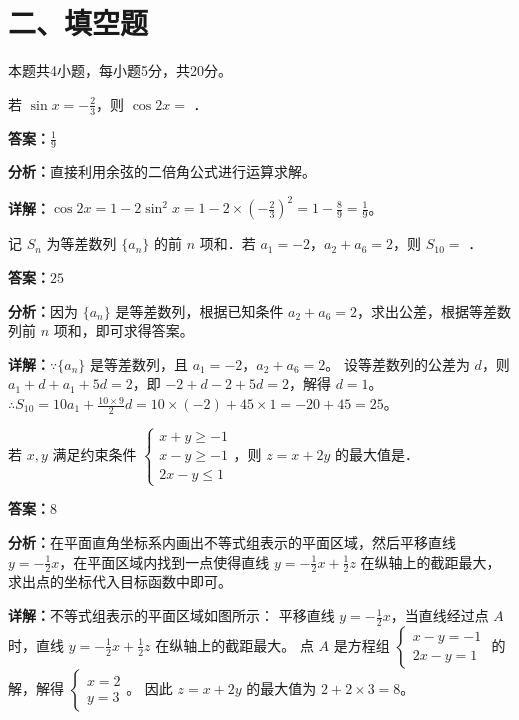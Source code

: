 \section*{二、填空题}
本题共4小题，每小题5分，共20分。

\begin{question}[points=5]
若 $\sin x = -\frac{2}{3}$，则 $\cos 2x = $ ．
\fillin[{$\frac{1}{9}$}]
\begin{solution}
\textbf{答案：}$\frac{1}{9}$

\textbf{分析：}直接利用余弦的二倍角公式进行运算求解。

\textbf{详解：}$\cos 2x = 1-2\sin^2 x = 1-2\times\left(-\frac{2}{3}\right)^2 = 1-\frac{8}{9} = \frac{1}{9}$。
\end{solution}
\end{question}

\begin{question}[points=5]
记 $S_n$ 为等差数列 $\{a_n\}$ 的前 $n$ 项和．若 $a_1=-2$，$a_2+a_6=2$，则 $S_{10}=$ ．
\fillin[{$25$}]
\begin{solution}
\textbf{答案：}$25$

\textbf{分析：}因为 $\{a_n\}$ 是等差数列，根据已知条件 $a_2+a_6=2$，求出公差，根据等差数列前 $n$ 项和，即可求得答案。

\textbf{详解：}$\because \{a_n\}$ 是等差数列，且 $a_1=-2$，$a_2+a_6=2$。
设等差数列的公差为 $d$，则 $a_1+d+a_1+5d=2$，即 $-2+d-2+5d=2$，解得 $d=1$。
$\therefore S_{10} = 10a_1 + \frac{10\times9}{2}d = 10\times(-2) + 45\times1 = -20+45=25$。
\end{solution}
\end{question}

\begin{question}[points=5]
若 $x,y$ 满足约束条件 $\begin{cases} x+y\ge -1 \\ x-y\ge -1 \\ 2x-y\le 1 \end{cases}$，则 $z=x+2y$ 的最大值是．
\fillin[{$8$}]
\begin{solution}
\textbf{答案：}$8$

\textbf{分析：}在平面直角坐标系内画出不等式组表示的平面区域，然后平移直线 $y=-\frac{1}{2}x$，在平面区域内找到一点使得直线 $y=-\frac{1}{2}x+\frac{1}{2}z$ 在纵轴上的截距最大，求出点的坐标代入目标函数中即可。

\textbf{详解：}不等式组表示的平面区域如图所示：
平移直线 $y=-\frac{1}{2}x$，当直线经过点 $A$ 时，直线 $y=-\frac{1}{2}x+\frac{1}{2}z$ 在纵轴上的截距最大。
点 $A$ 是方程组 $\begin{cases} x-y=-1 \\ 2x-y=1 \end{cases}$ 的解，解得 $\begin{cases} x=2 \\ y=3 \end{cases}$。
因此 $z=x+2y$ 的最大值为 $2+2\times3=8$。
\end{solution}
\end{question}

